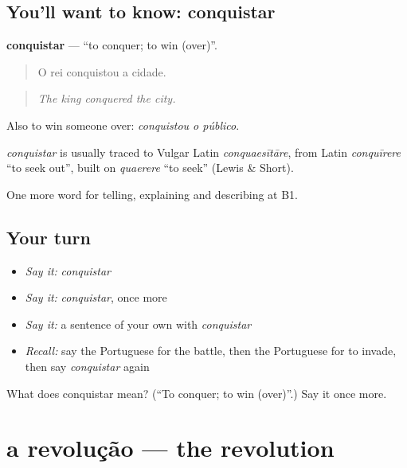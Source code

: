 \subsection*{You'll want to know: conquistar}
\textbf{conquistar} — \textquotedblleft{}to conquer; to win (over)\textquotedblright{}.

\begin{quote}
O rei conquistou a cidade.
\end{quote}

\begin{quote}
\emph{The king conquered the city.}
\end{quote}

Also to win someone over: \emph{conquistou o público}.

\begin{cousinweb}
\emph{conquistar} is usually traced to Vulgar Latin \emph{conquaesītāre}, from Latin \emph{conquīrere} \textquotedblleft{}to seek out\textquotedblright{}, built on \emph{quaerere} \textquotedblleft{}to seek\textquotedblright{} (Lewis \& Short).
\end{cousinweb}

\begin{grammarlens}[title={What you've built}]
One more word for telling, explaining and describing at B1.
\end{grammarlens}

\subsection*{Your turn}
\begin{itemize}
\raggedright
  \item \emph{Say it:} \emph{conquistar}
  \item \emph{Say it:} \emph{conquistar}, once more
  \item \emph{Say it:} a sentence of your own with \emph{conquistar}
  \item \emph{Recall:} say the Portuguese for the battle, then the Portuguese for to invade, then say \emph{conquistar} again
\end{itemize}

\begin{tcolorbox}[breakable,colback=teal!4,colframe=teal!35!black,title={Before you move on}]
What does conquistar mean? (\textquotedblleft{}To conquer; to win (over)\textquotedblright{}.) Say it once more.
\end{tcolorbox}
\section[a revolução]{a revolução — the revolution}


